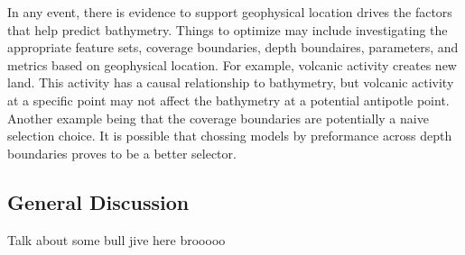\par
In any event, there is evidence to support geophysical location drives the factors that help predict bathymetry.
Things to optimize may include investigating the appropriate feature sets, coverage boundaries, depth boundaires, parameters, and metrics based on geophysical location.
For example, volcanic activity creates new land.
This activity has a causal relationship to bathymetry, but volcanic activity at a specific point may not affect the bathymetry at a potential antipotle point.
Another example being that the coverage boundaries are potentially a naive selection choice.
It is possible that chossing models by preformance across depth boundaries proves to be a better selector.


\subsection{General Discussion}
Talk about some bull jive here brooooo